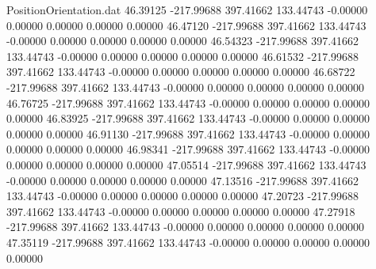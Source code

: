 \begin{filecontents}{PositionOrientation.dat}
  46.39125 -217.99688  397.41662   133.44743   -0.00000    0.00000    0.00000    0.00000    0.00000
  46.47120 -217.99688  397.41662   133.44743   -0.00000    0.00000    0.00000    0.00000    0.00000
  46.54323 -217.99688  397.41662   133.44743   -0.00000    0.00000    0.00000    0.00000    0.00000
  46.61532 -217.99688  397.41662   133.44743   -0.00000    0.00000    0.00000    0.00000    0.00000
  46.68722 -217.99688  397.41662   133.44743   -0.00000    0.00000    0.00000    0.00000    0.00000
  46.76725 -217.99688  397.41662   133.44743   -0.00000    0.00000    0.00000    0.00000    0.00000
  46.83925 -217.99688  397.41662   133.44743   -0.00000    0.00000    0.00000    0.00000    0.00000
  46.91130 -217.99688  397.41662   133.44743   -0.00000    0.00000    0.00000    0.00000    0.00000
  46.98341 -217.99688  397.41662   133.44743   -0.00000    0.00000    0.00000    0.00000    0.00000
  47.05514 -217.99688  397.41662   133.44743   -0.00000    0.00000    0.00000    0.00000    0.00000
  47.13516 -217.99688  397.41662   133.44743   -0.00000    0.00000    0.00000    0.00000    0.00000
  47.20723 -217.99688  397.41662   133.44743   -0.00000    0.00000    0.00000    0.00000    0.00000
  47.27918 -217.99688  397.41662   133.44743   -0.00000    0.00000    0.00000    0.00000    0.00000
  47.35119 -217.99688  397.41662   133.44743   -0.00000    0.00000    0.00000    0.00000    0.00000
\end{filecontents}
